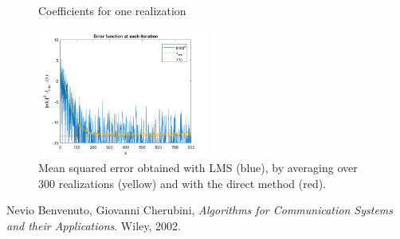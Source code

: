 \documentclass[a4paper, 12pt]{report}
\begin{document}
\begin{figure}[H]
	\centering
	\caption{Coefficients for one realization}
	\label{fig:coeff1}
\end{figure}

\begin{figure}[H]
	\centering
	\includegraphics[width=0.5\textwidth]{err_lms}
	\caption{Mean squared error obtained with LMS (blue), by averaging over 300 realizations (yellow) and with the direct method (red).}
	\label{fig:err_lms}
\end{figure}

\begin{thebibliography}{15}
	Nevio Benvenuto, Giovanni Cherubini,
	\textit{Algorithms for Communication Systems and their Applications}. 
	Wiley, 2002.
\end{thebibliography}
\end{document}
